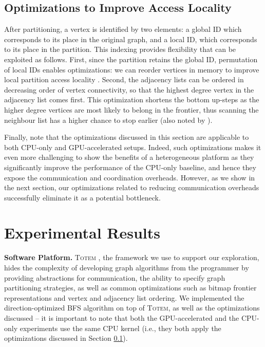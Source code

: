 \documentclass{llncs}
\begin{document}
\subsection{Optimizations to Improve Access Locality}\label{sec:reindexing}After partitioning, a vertex is identified by two elements: a global ID which corresponds to its place in the original graph, and a local ID, which corresponds to its place in the partition. This indexing provides flexibility that can be exploited as follows. First, since the partition retains the global ID, permutation of local IDs enables optimizations: we can reorder vertices in memory to improve local partition access locality \cite{sallinen2014exploring}. Second, the adjacency lists can be ordered in decreasing order of vertex connectivity, so that the highest degree vertex in the adjacency list comes first. This optimization shortens the bottom up-steps as the higher degree vertices are most likely to belong in the frontier, thus scanning the neighbour list has a higher chance to stop earlier (also noted by \cite{yasui2014fast}).



Finally, note that the optimizations discussed in this section are applicable to both CPU-only and GPU-accelerated setups. Indeed, such optimizations makes it even more challenging to show the benefits of a heterogeneous platform as they significantly improve the performance of the CPU-only baseline, and hence they expose the communication and coordination overheads. However, as we show in the next section, our optimizations related to reducing communication overheads successfully eliminate it as a potential bottleneck. 
\section{Experimental Results}\label{sec:experiments}\textbf{Software Platform.} \textsc{Totem} \cite{gharaibeh2014efficient}, the framework we use to support our exploration, hides the complexity of developing graph algorithms from the programmer by providing abstractions for communication, the ability to specify graph partitioning strategies, as well as common optimizations such as bitmap frontier representations and vertex and adjacency list ordering. We implemented the direction-optimized BFS algorithm on top of \textsc{Totem}, as well as the optimizations discussed -- it is important to note that both the GPU-accelerated and the CPU-only experiments use the same CPU kernel (i.e., they both apply the optimizations discussed in Section \ref{sec:reindexing}).
\end{document}
